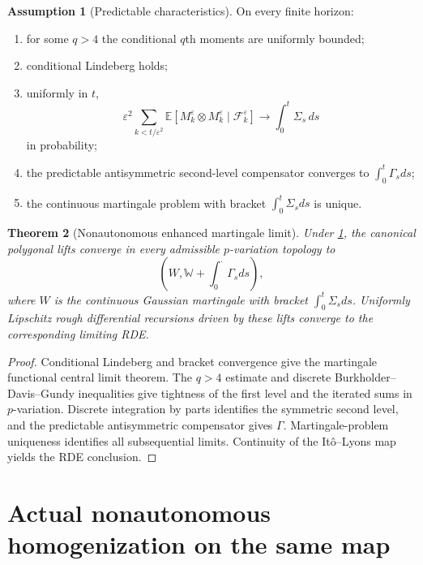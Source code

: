 \documentclass[11pt,reqno]{amsart}
\newtheorem{theorem}{Theorem}[section]
\theoremstyle{definition}
\newtheorem{assumption}[theorem]{Assumption}
\theoremstyle{remark}
\newcommand{\E}{\mathbb E}
\newcommand{\F}{\mathcal F}
\begin{document}
\begin{assumption}[Predictable characteristics]\label{ass:chars}
On every finite horizon:
\begin{enumerate}[label=(\roman*)]
\item for some $q>4$ the conditional $q$th moments are uniformly bounded;
\item conditional Lindeberg holds;
\item uniformly in $t$,
\[
 \varepsilon^2\sum_{k<t/\varepsilon^2}
 \E[M_k^\varepsilon\otimes M_k^\varepsilon\mid
 \F_k^\varepsilon]
 \longrightarrow\int_0^t\Sigma_s\,ds
\]
in probability;
\item the predictable antisymmetric second-level compensator converges to
$\int_0^t\Gamma_sds$;
\item the continuous martingale problem with bracket
$\int_0^t\Sigma_sds$ is unique.
\end{enumerate}
\end{assumption}

\begin{theorem}[Nonautonomous enhanced martingale limit]\label{thm:rough}
Under \cref{ass:chars}, the canonical polygonal lifts converge in every
admissible $p$-variation topology to
\[
 \left(W,\mathbb W+\int_0^{\cdot}\Gamma_sds\right),
\]
where $W$ is the continuous Gaussian martingale with bracket
$\int_0^t\Sigma_sds$.  Uniformly Lipschitz rough differential recursions driven
by these lifts converge to the corresponding limiting RDE.
\end{theorem}

\begin{proof}
Conditional Lindeberg and bracket convergence give the martingale functional
central limit theorem.  The $q>4$ estimate and discrete
Burkholder--Davis--Gundy inequalities give tightness of the first level and the
iterated sums in $p$-variation.  Discrete integration by parts identifies the
symmetric second level, and the predictable antisymmetric compensator gives
$\Gamma$.  Martingale-problem uniqueness identifies all subsequential limits.
Continuity of the It\^o--Lyons map yields the RDE conclusion.
\end{proof}

\section{Actual nonautonomous homogenization on the same map}\label{sec:actual}
\end{document}
